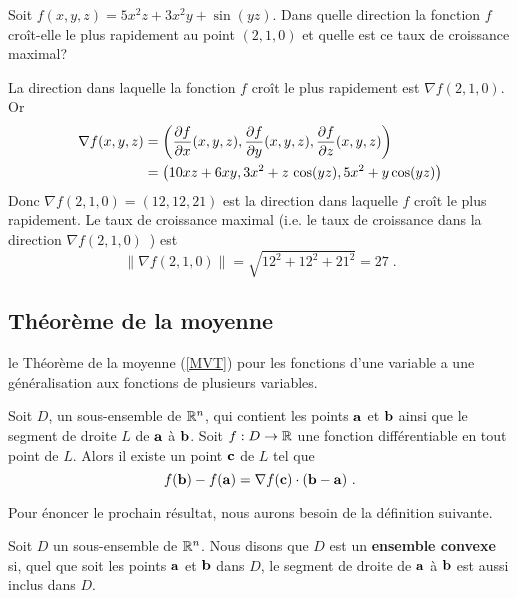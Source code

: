 {

\begin{egg}
Soit $f(x,y,z) = 5x^2z+3x^2y+\sin(yz)$.  Dans quelle direction la fonction
$f$ croît-elle le plus rapidement au point $(2,1,0)$ et quelle est ce taux de
croissance maximal?

La direction dans laquelle la fonction $f$ croît le plus rapidement est
$\nabla f(2,1,0)$.  Or
\begin{align*}
\nabla f(x,y,z) &= \left(\frac{\partial f}{\partial x}(x,y,z), \frac{\partial f}{\partial y}(x,y,z), 
\frac{\partial f}{\partial z}(x,y,z) \right)\\
&=\left( 10xz +6xy, 3x^2 + z\,\cos(yz) , 5x^2 + y \cos(yz) \right)
\end{align*}
Donc $\nabla f(2,1,0) = (12, 12, 21)$ est la direction dans laquelle $f$
croît le plus rapidement.  Le taux de croissance maximal (i.e. le taux de
croissance dans la direction $\nabla f(2,1,0)$\ ) est
\[
\|\nabla f(2,1,0)\| = \sqrt{12^2+12^2 + 21^2} = 27 \; .
\]
\end{egg}

\subsection{Théorème de la moyenne}

le Théorème de la moyenne (\ref{MVT}) pour les fonctions d'une
variable a une généralisation aux fonctions de plusieurs variables.

\begin{focus}{\thm}
Soit $D$, un sous-ensemble de $\mathbb{R}^n$, qui contient les points
$\mathbf{a}$ et $\mathbf{b}$ ainsi que le segment de droite $L$ de $\mathbf{a}$
à $\mathbf{b}$.  Soit $f:D \to \mathbb{R}$ une fonction différentiable en tout
point de $L$.  Alors il existe un point $\mathbf{c}$ de $L$ tel que
\[
  f(\mathbf{b}) - f(\mathbf{a}) = \nabla f(\mathbf{c})\cdot (\mathbf{b}-\mathbf{a}) \ .
\]
\end{focus}

Pour énoncer le prochain résultat, nous aurons besoin de la
définition suivante.

\begin{focus}{\dfn} 
Soit $D$ un sous-ensemble de $\mathbb{R}^n$.  Nous disons que $D$ est un
{\bfseries ensemble convexe} si, quel que soit les points $\mathbf{a}$
et $\mathbf{b}$ dans $D$, le segment de droite de $\mathbf{a}$ à
$\mathbf{b}$ est aussi inclus dans $D$.
\end{focus}

}
